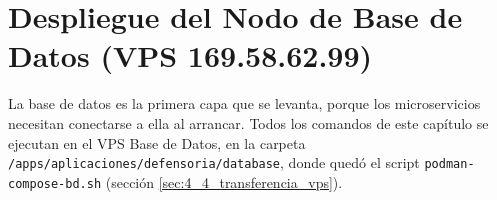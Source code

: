 \section{Despliegue del Nodo de Base de Datos (VPS 169.58.62.99)}\label{cap:05_despliegue_base_datos}
La base de datos es la primera capa que se levanta, porque los microservicios necesitan conectarse a ella al arrancar. Todos los comandos de este capítulo se ejecutan en el VPS Base de Datos, en la carpeta \nolinkurl{/apps/aplicaciones/defensoria/database}, donde quedó el script \texttt{podman-compose-bd.sh} (sección \ref{sec:4_4_transferencia_vps}).





